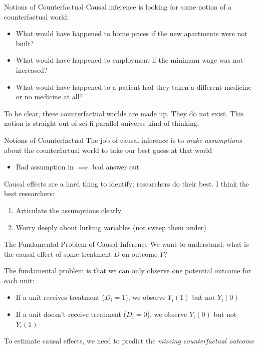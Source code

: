 \documentclass[aspectratio=169,t,11pt,table]{beamer}
\begin{document}
\begin{frame}{Notions of Counterfactual}
  Causal inference is looking for some notion of a \alert{counterfactual} world:
  \begin{itemize}
    \item What would have happened to home prices if the new apartments were not built? 
    
    \item What would have happened to employment if the minimum wage was not increased? 
    
    \item What would have happened to a patient had they taken a different medicine or no medicine at all?
  \end{itemize}

  To be clear, these counterfactual worlds are \alert{made up}. They do not exist. This notion is straight out of sci-fi parallel universe kind of thinking.
\end{frame}

\begin{frame}{Notions of Counterfactual}
  The job of causal inference is to \emph{make assumptions} about the counterfactual world to take our best guess at that world
  \begin{itemize}
    \item Bad assumption in $\implies$ bad answer out
  \end{itemize}

  \bigskip
  Causal effects are a hard thing to identify; researchers do their best. I think the best researchers:
  \begin{enumerate}
    \item Articulate the assumptions clearly
    
    \item Worry deeply about lurking variables (not sweep them under)
  \end{enumerate}
\end{frame}

\begin{frame}{The Fundamental Problem of Causal Inference}
  We want to understand: what is the causal effect of some treatment $D$ on outcome $Y$?
  
  \bigskip
  The \alert{fundamental problem} is that we can only observe one potential outcome for each unit:
  \begin{itemize}
    \item If a unit receives treatment ($D_i = 1$), we observe $Y_i(1)$ but not $Y_i(0)$
    \item If a unit doesn't receive treatment ($D_i = 0$), we observe $Y_i(0)$ but not $Y_i(1)$
  \end{itemize}
  
  \bigskip
  To estimate causal effects, we need to predict the \emph{missing counterfactual outcome}
\end{frame}
\end{document}
